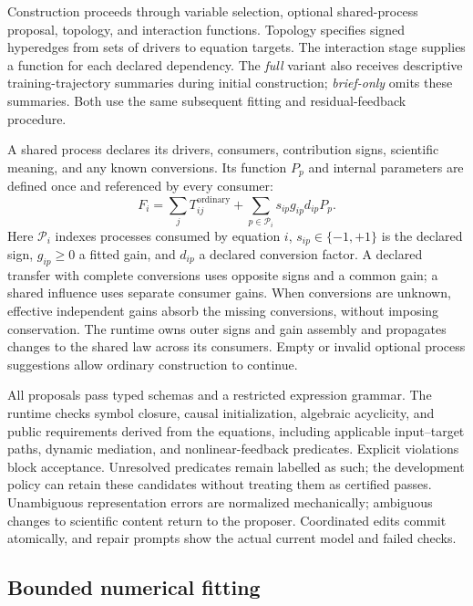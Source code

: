 Construction proceeds through variable selection, optional shared-process
proposal, topology, and interaction functions. Topology specifies signed
hyperedges from sets of drivers to equation targets. The interaction stage
supplies a function for each declared dependency. The \textit{full} variant also
receives descriptive training-trajectory summaries during initial construction;
\textit{brief-only} omits these summaries. Both use the same subsequent fitting
and residual-feedback procedure.

A shared process declares its drivers, consumers, contribution signs, scientific
meaning, and any known conversions. Its function $P_p$ and internal parameters
are defined once and referenced by every consumer:
\begin{equation}
 F_i=\sum_j T_{ij}^{\mathrm{ordinary}}
       +\sum_{p\in\mathcal P_i}s_{ip}g_{ip}d_{ip}P_p.
 \label{eq:af-process}
\end{equation}
Here $\mathcal P_i$ indexes processes consumed by equation $i$,
$s_{ip}\in\{-1,+1\}$ is the declared sign, $g_{ip}\geq0$ a fitted gain,
and $d_{ip}$ a declared conversion factor. A declared transfer with complete
conversions uses opposite signs and a common gain; a shared influence uses
separate consumer gains. When conversions are unknown, effective independent
gains absorb the missing conversions, without imposing conservation. The runtime
owns outer signs and gain assembly and propagates changes to the shared law
across its consumers. Empty or invalid optional process suggestions allow ordinary
construction to continue.

All proposals pass typed schemas and a restricted expression grammar. The runtime
checks symbol closure, causal initialization, algebraic acyclicity, and public
requirements derived from the equations, including applicable input--target
paths, dynamic mediation, and nonlinear-feedback predicates. Explicit violations
block acceptance. Unresolved predicates remain labelled as such; the development
policy can retain these candidates without treating them as certified passes.
Unambiguous representation errors are normalized mechanically; ambiguous changes
to scientific content return to the proposer. Coordinated edits commit atomically,
and repair prompts show the actual current model and failed checks.

\subsection{Bounded numerical fitting}
\label{sec:af-fitting}

